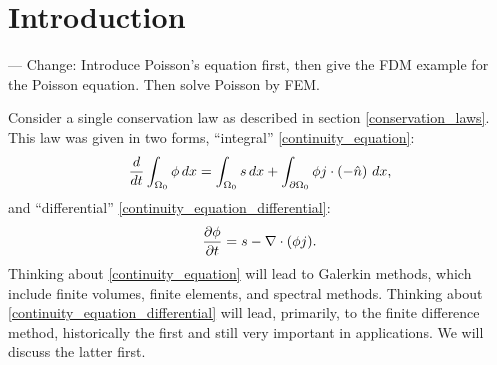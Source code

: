 
\section{Introduction}

--- Change: Introduce Poisson's equation first, then give the FDM example for the Poisson equation. Then solve Poisson by FEM.

Consider a single conservation law as described in section \ref{conservation_laws}. This law
was given in two forms, ``integral'' \eqref{continuity_equation}:
\begin{equation*}
    \frac{d}{dt} \int_{\Omega_0} \phi\,dx = \int_{\Omega_0} s\,dx + \int_{{\partial\Omega_0}} \phi j \cdot \left(-\hat{n}\right)\,dx,
\end{equation*}
and ``differential'' \eqref{continuity_equation_differential}:
\begin{equation*}
    \frac{\partial \phi}{\partial t} = s - \nabla\cdot (\phi j).
\end{equation*}
Thinking about \eqref{continuity_equation} will lead to Galerkin methods, which include finite volumes, finite elements, and spectral methods.
Thinking about \eqref{continuity_equation_differential} will lead, primarily, to the finite difference method, historically the first and
still very important in applications. We will discuss the latter first.

